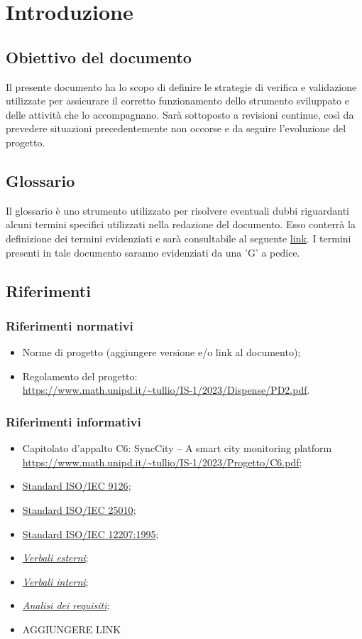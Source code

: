 \section{Introduzione}
\subsection{Obiettivo del documento}
Il presente documento ha lo scopo di definire le strategie di verifica e validazione utilizzate per assicurare il corretto funzionamento dello strumento sviluppato e delle
attività che lo accompagnano.  Sarà sottoposto a revisioni continue, così da prevedere situazioni precedentemente non occorse e da seguire l'evoluzione del progetto.
\subsection{Glossario}
Il glossario è uno strumento utilizzato per risolvere eventuali dubbi riguardanti 
alcuni termini specifici utilizzati nella redazione del documento.
Esso conterrà la definizione dei termini evidenziati e sarà consultabile al seguente \href{https://7last.github.io/docs/rtb/documentazione-interna/glossario}{link}. I termini presenti in tale documento saranno evidenziati da una 'G' a pedice.
\subsection{Riferimenti}
\subsubsection{Riferimenti normativi}
\begin{itemize}
    \item Norme di progetto (aggiungere versione e/o link al documento);
    \item Regolamento del progetto:\\
		  \url{https://www.math.unipd.it/~tullio/IS-1/2023/Dispense/PD2.pdf}.
\end{itemize}
\subsubsection{Riferimenti informativi}
\begin{itemize}
    \item Capitolato d'appalto C6: SyncCity – A smart city monitoring platform\\
    \url{https://www.math.unipd.it/~tullio/IS-1/2023/Progetto/C6.pdf};
    \item \href{https://it.wikipedia.org/wiki/ISO/IEC_9126}{Standard ISO/IEC 9126};
    \item \href{https://iso25000.com/index.php/en/iso-25000-standards/iso-25010}{Standard ISO/IEC 25010};
    \item \href{ https://en.wikipedia.org/wiki/ISO/IEC_12207}{Standard ISO/IEC 12207:1995};
    \item \href{URL}{\textit{Verbali esterni}};
    \item \href{URL}{\textit{Verbali interni}};
    \item \href{URL}{\textit{Analisi dei requisiti}};
    \item AGGIUNGERE LINK
\end{itemize}
